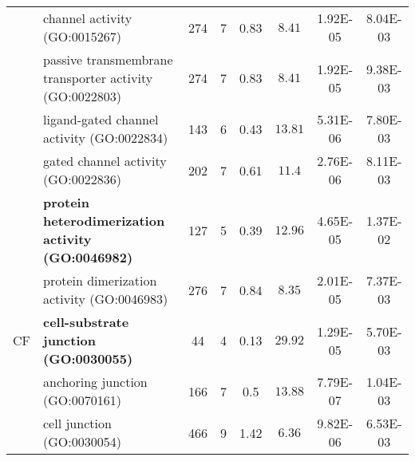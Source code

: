 \begin{table}[!b]
\begin{center}
\begin{tabular}{clS[table-format=4.0]S[table-format=2.0]S[table-format=2.2]ccc}
 & channel activity (GO:0015267) & 274 & 7 & 0.83 & $8.41$ & 1.92E-05 & 8.04E-03 \\
 & passive transmembrane transporter activity (GO:0022803) & 274 & 7 & 0.83 & $8.41$ & 1.92E-05 & 9.38E-03 \\
 & ligand-gated channel activity (GO:0022834) & 143 & 6 & 0.43 & $13.81$ & 5.31E-06 & 7.80E-03 \\
 & gated channel activity (GO:0022836) & 202 & 7 & 0.61 & $11.4$ & 2.76E-06 & 8.11E-03 \\[1.5ex]
 & \textbf{protein heterodimerization activity (GO:0046982)} & 127 & 5 & 0.39 & $12.96$ & 4.65E-05 & 1.37E-02 \\
 & protein dimerization activity (GO:0046983) & 276 & 7 & 0.84 & $8.35$ & 2.01E-05 & 7.37E-03 \\
 \midrule
CF & \textbf{cell-substrate junction (GO:0030055)} & 44 & 4 & 0.13 & $29.92$ & 1.29E-05 & 5.70E-03 \\
 & anchoring junction (GO:0070161) & 166 & 7 & 0.5 & $13.88$ & 7.79E-07 & 1.04E-03 \\
 & cell junction (GO:0030054) & 466 & 9 & 1.42 & $6.36$ & 9.82E-06 & 6.53E-03 \\
\bottomrule
\end{tabular}
\end{center}
\end{table}


